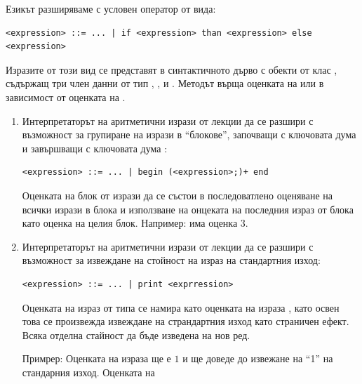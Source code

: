 {\begin{mdframed}[hidealllines=true,backgroundcolor=gray!20]
Езикът разширяваме с условен оператор от вида:
\begin{flushleft}
  \begin{lstlisting}[mathescape]
<expression> ::= ... | if <expression> than <expression> else <expression>
  \end{lstlisting}
\end{flushleft}

Изразите от този вид се представят в синтактичното дърво с обекти от клас , съдържащ три член данни от тип , ,  и . Методът  върща оценката на  или  в зависимост от оценката на .
\end{mdframed}

\begin{enumerate}[resume]
\item Интерпретаторът на аритметични изрази от лекции да се разшири с възможност за групиране на изрази в ``блокове'', започващи с ключовата дума  и завършващи с ключовата дума :
\begin{flushleft}
  \begin{lstlisting}[mathescape]
<expression> ::= ... | begin (<expression>;)+ end
  \end{lstlisting}
\end{flushleft}

Оценката на блок от изрази да се състои в последоватлено оценяване на всички изрази в блока и използване на онцеката на последния израз от блока като оценка на целия блок. Например:  има оценка $3$.

\item Интерпретаторът на аритметични изрази от лекции да се разшири с възможност за извеждане на стойност на израз на стандартния изход:
\begin{flushleft}
  \begin{lstlisting}[mathescape]
<expression> ::= ... | print <exprression>
  \end{lstlisting}
\end{flushleft}

Оценката на израз от типа  се намира като оценката на израза , като освен това се произвежда извеждане на страндартния изход като страничен ефект. Всяка отделна стайност да бъде изведена на нов ред.

Примрер: Оценката на израза  ще е $1$ и ще доведе до извежане на ``1'' на стандарния изход. Оценката на 


\end{enumerate}}
